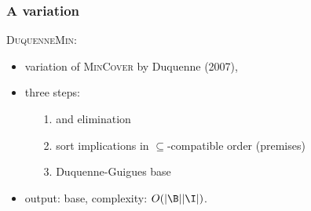 \begin{frame}
\frametitle{A variation}

\textsc{DuquenneMin}:
\begin{itemize}
	\item variation of \textsc{MinCover} by Duquenne (2007),
	\item three steps:
		\begin{itemize}
			\item[\color{belize} 1.]  and  elimination
			\item[ ] 
			\item[ ] 
			
			\vspace{0.5em}
			
			\item[\color{belize} 2.] sort implications in $\subseteq$-compatible order (premises)
			
			\vspace{0.5em}
			
			\item[\color{belize} 3.]  Duquenne-Guigues base
			\item[ ] 
		\end{itemize}
	
	\item output:  base, complexity: $O(|\B||\I|)$.
	
\end{itemize}
\end{frame}

